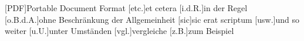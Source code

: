 \begin{acronym}[XXXXXX]
    \vspace{\parskip}

    [PDF]{Portable Document Format}
    [etc.]{et cetera}
    [i.d.R.]{in der Regel}
    [o.B.d.A.]{ohne Beschränkung der Allgemeinheit}
    [sic]{sic erat scriptum}
    [usw.]{und so weiter}
    [u.U.]{unter Umständen}
    [vgl.]{vergleiche}
    [z.B.]{zum Beispiel}
\end{acronym}
